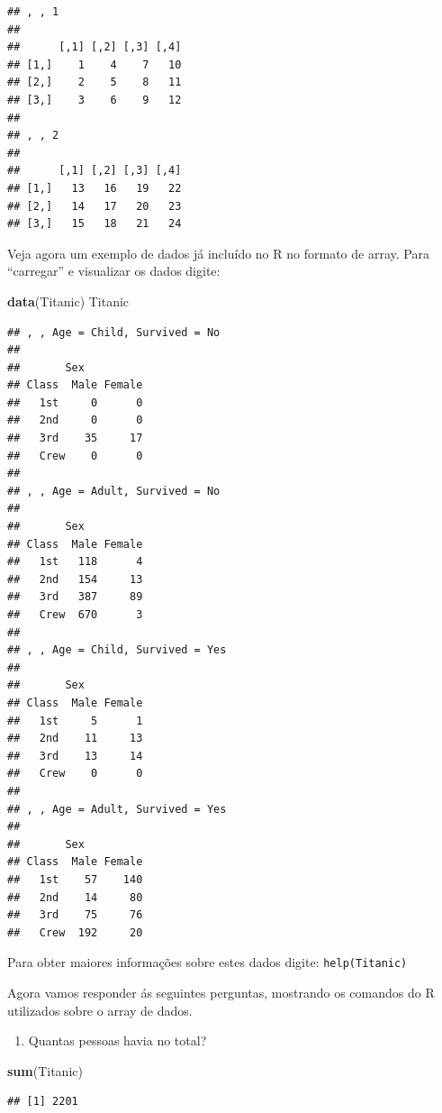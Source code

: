\documentclass[]{book}
\newenvironment{Shaded}{\begin{snugshade}}{\end{snugshade}}
\newcommand{\KeywordTok}[1]{\textcolor[rgb]{0.13,0.29,0.53}{\textbf{#1}}}
\newcommand{\NormalTok}[1]{#1}
\providecommand{\tightlist}{%
  \setlength{\itemsep}{0pt}\setlength{\parskip}{0pt}}
\begin{document}
\begin{verbatim}
## , , 1
## 
##      [,1] [,2] [,3] [,4]
## [1,]    1    4    7   10
## [2,]    2    5    8   11
## [3,]    3    6    9   12
## 
## , , 2
## 
##      [,1] [,2] [,3] [,4]
## [1,]   13   16   19   22
## [2,]   14   17   20   23
## [3,]   15   18   21   24
\end{verbatim}

Veja agora um exemplo de dados já incluído no R no formato de array. Para ``carregar'' e visualizar os dados digite:

\begin{Shaded}
\begin{Highlighting}[]
\KeywordTok{data}\NormalTok{(Titanic) }
\NormalTok{Titanic}
\end{Highlighting}
\end{Shaded}

\begin{verbatim}
## , , Age = Child, Survived = No
## 
##       Sex
## Class  Male Female
##   1st     0      0
##   2nd     0      0
##   3rd    35     17
##   Crew    0      0
## 
## , , Age = Adult, Survived = No
## 
##       Sex
## Class  Male Female
##   1st   118      4
##   2nd   154     13
##   3rd   387     89
##   Crew  670      3
## 
## , , Age = Child, Survived = Yes
## 
##       Sex
## Class  Male Female
##   1st     5      1
##   2nd    11     13
##   3rd    13     14
##   Crew    0      0
## 
## , , Age = Adult, Survived = Yes
## 
##       Sex
## Class  Male Female
##   1st    57    140
##   2nd    14     80
##   3rd    75     76
##   Crew  192     20
\end{verbatim}

Para obter maiores informações sobre estes dados digite: \texttt{help(Titanic)}

Agora vamos responder ás seguintes perguntas, mostrando os comandos do R utilizados sobre o array de dados.

\begin{enumerate}
\def\labelenumi{\arabic{enumi}.}
\tightlist
\item
  Quantas pessoas havia no total?
\end{enumerate}

\begin{Shaded}
\begin{Highlighting}[]
\KeywordTok{sum}\NormalTok{(Titanic)}
\end{Highlighting}
\end{Shaded}

\begin{verbatim}
## [1] 2201
\end{verbatim}
\end{document}
